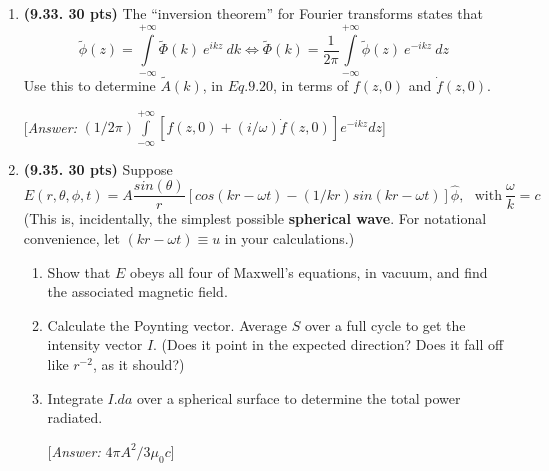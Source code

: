 \documentclass[fleqn]{article}
\begin{document}
\begin{enumerate}
    \item \textbf{(9.33. 30 pts)} The “inversion theorem” for Fourier transforms states that
    $$
      \tilde{\phi}(z)=\int\limits_{-\infty}^{+\infty} \tilde{\Phi}(k) ~ e^{ikz} ~ dk 
      \Longleftrightarrow 
      \tilde{\Phi}(k)=\dfrac{1}{2 \pi} \int\limits_{-\infty}^{+\infty} \tilde{\phi}(z) ~ e^{-ikz} ~ dz 
    $$
    Use this to determine $\tilde{A}(k)$, in $Eq. 9.20$, in terms of $f(z, 0)$ and $\dot{f}(z,0)$.

    [\emph{Answer:} $(1/2 \pi) \int\limits_{-\infty}^{+\infty} \left[
      f(z, 0)+(i/\omega) \dot{f}(z,0)
    \right]e^{-ikz} dz$]


    \item \textbf{(9.35. 30 pts)} Suppose
    $$
      E(r, \theta, \phi, t)=A \dfrac{sin(\theta)}{r} \left[
        cos\left(kr-\omega t\right)-\left(1/kr\right) sin\left(kr-\omega t\right)
      \right] \hat{\phi}, ~~~ \text{with} ~ \dfrac{\omega}{k}=c
    $$
    (This is, incidentally, the simplest possible \textbf{spherical wave}. For notational convenience, 
    let $\left(kr-\omega t\right) \equiv u$ in your calculations.)
    \begin{enumerate}
      \item Show that $E$ obeys all four of Maxwell’s equations, in vacuum, and find the
      associated magnetic field.


      \item Calculate the Poynting vector. Average $S$ over a full cycle to get the intensity
      vector $I$. (Does it point in the expected direction? Does it fall off like $r^{−2}$, as it
      should?)


      \item Integrate $I.da$ over a spherical surface to determine the total power radiated.
      
      [\emph{Answer:} $4 \pi A^2/3 \mu_0 c$]


    \end{enumerate}

  \end{enumerate}
\end{document}
